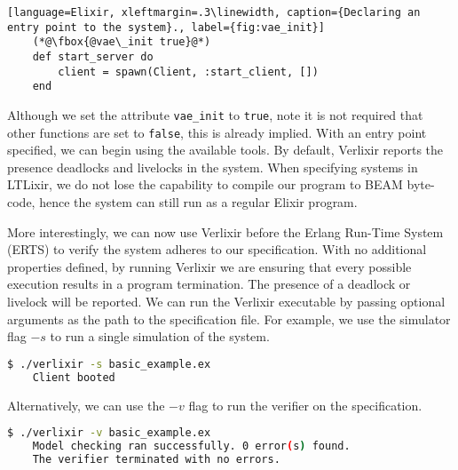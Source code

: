 \begin{lstlisting}[language=Elixir, xleftmargin=.3\linewidth, caption={Declaring an entry point to the system}., label={fig:vae_init}]
    (*@\fbox{@vae\_init true}@*)
    def start_server do
        client = spawn(Client, :start_client, [])
    end
\end{lstlisting}
Although we set the attribute \texttt{vae\_init} to \texttt{true}, note it is not required that other functions are set to \texttt{false}, this is already implied. With an entry point specified, we can begin using the available tools. By default, Verlixir reports the presence deadlocks and livelocks in the system. When specifying systems in LTLixir, we do not lose the capability to compile our program to BEAM byte-code, hence the system can still run as a regular Elixir program.
\par
More interestingly, we can now use Verlixir before the Erlang Run-Time System (ERTS) to verify the system adheres to our specification. With no additional properties defined, by running Verlixir we are ensuring that every possible execution results in a program termination. The presence of a deadlock or livelock will be reported. We can run the Verlixir executable by passing optional arguments as the path to the specification file. For example, we use the simulator flag $-s$ to run a single simulation of the system.
\begin{lstlisting}[language=bash, xleftmargin=.3\linewidth]
    $ ./verlixir -s basic_example.ex 
    Client booted
\end{lstlisting}
Alternatively, we can use the $-v$ flag to run the verifier on the specification.
\begin{lstlisting}[language=bash, xleftmargin=.3\linewidth]
    $ ./verlixir -v basic_example.ex 
    Model checking ran successfully. 0 error(s) found.
    The verifier terminated with no errors.
\end{lstlisting}
